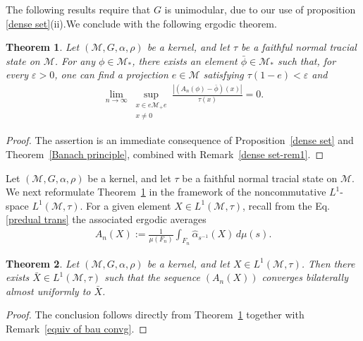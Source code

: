 \documentclass[11pt]{amsart}
\newtheorem{thm}{Theorem}[section]
\theoremstyle{definition}
\theoremstyle{myremark}
\numberwithin{equation}{section}
\newcommand{\abs}[1]{\left\vert#1\right\vert}
\begin{document}
\noindent The following results require that $G$ is unimodular, due to our use of proposition \ref{dense set}(ii).We conclude with the following ergodic theorem.
\begin{thm}\label{erg thm-1}
	Let $(\mathcal{M}, G, \alpha, \rho)$ be a kernel, and let $\tau$ be a faithful normal tracial state on $\mathcal{M}$. For any $\phi \in \mathcal{M}_*$, there exists an element $\bar{\phi} \in \mathcal{M}_*$ such that, for every $\varepsilon > 0$, one can find a projection $e \in \mathcal{M}$ satisfying $\tau(1-e) < \varepsilon$ and
	\begin{align*}
		\lim_{n \to \infty}
		\sup_{\substack{x \in e\mathcal{M}_+e \\ x \neq 0}}
		\frac{\abs{(A_n(\phi) - \bar{\phi})(x)}}{\tau(x)} = 0 .
	\end{align*}
\end{thm}

\begin{proof}
	The assertion is an immediate consequence of Proposition~\ref{dense set} and Theorem~\ref{Banach principle}, combined with Remark~\ref{dense set-rem1}.
\end{proof}

\noindent Let $(\mathcal{M}, G, \alpha, \rho)$ be a kernel, and let $\tau$ be a faithful normal tracial state on $\mathcal{M}$. We next reformulate Theorem~\ref{erg thm-1} in the framework of the noncommutative $L^1$-space $L^1(\mathcal{M},\tau)$. For a given element $X \in L^1(\mathcal{M},\tau)$, recall from the Eq.\ref{predual trans} the associated ergodic averages
\begin{align*}
	A_n(X)
	:= \frac{1}{\mu(F_n)} \int_{F_n} \hat{\alpha}_{s^{-1}}(X) \, d\mu(s).
\end{align*}


\begin{thm}\label{erg thm-2}
	Let $(\mathcal{M}, G, \alpha, \rho)$ be a kernel, and let $X \in L^1(\mathcal{M},\tau)$. Then there exists $\bar{X} \in L^1(\mathcal{M},\tau)$ such that the sequence $(A_n(X))$ converges bilaterally almost uniformly to $\bar{X}$.
\end{thm}

\begin{proof}
	The conclusion follows directly from Theorem~\ref{erg thm-1} together with Remark~\ref{equiv of bau convg}.
\end{proof}
\end{document}
